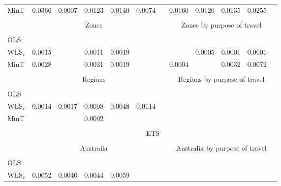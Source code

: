 \documentclass[11pt]{article}
\newcommand{\0}{\phantom{0}}
\begin{document}
\begin{table}[p]
\begin{threeparttable}
\begin{tabular}{lrrrrrrrrrrr}
			MinT & 0.0366 & 0.0007 & 0.0123 & 0.0140 & 0.0074 & & 0.0160 & 0.0120 & 0.0135 & 0.0255 & \bm{$-0.0164$} \\
			\cline{2-6} \cline{8-12}\\[-0.3cm]
			& \multicolumn{5}{c}{Zones} & & \multicolumn{5}{c}{Zones by purpose of travel} \\
			\cline{2-6} \cline{8-12} \\[-0.3cm]
			OLS & \bm{$-0.1115$} & \bm{$-0.1038$} & \bm{$-0.1090$} & \bm{$-0.1141$} & \bm{$-0.1489$} & & \bm{$-0.4320$} & \bm{$-0.6144$} & \bm{$-0.5723$} & \bm{$-0.7088$} & \bm{$-0.6646$} \\
			WLS$_{v}$ & 0.0015 & \bm{$-0.0009$} & 0.0011 & 0.0019 & \bm{$-0.0018$} & & \bm{$-0.0004$} & 0.0005 & 0.0001 & 0.0001 & \bm{$-0.0071$} \\
			MinT & 0.0028 & \bm{$-0.0037$} & 0.0031 & 0.0019 & \bm{$-0.0161$} & & 0.0004 & \bm{$-0.0044$} & 0.0032 & 0.0072 & \bm{$-0.0234$} \\
			\cline{2-6} \cline{8-12}\\[-0.3cm]
			& \multicolumn{5}{c}{Regions} & & \multicolumn{5}{c}{Regions by purpose of travel} \\
			\cline{2-6} \cline{8-12} \\[-0.3cm]
			OLS & \bm{$-0.1474$} & \bm{$-0.1246$} & \bm{$-0.1164$} & \bm{$-0.1263$} & \bm{$-0.1480$} & & \bm{$-0.5573$} & \bm{$-0.6581$} & \bm{$-0.5831$} & \bm{$-0.7258$} & \bm{$-0.7480$} \\
			WLS$_{v}$ & 0.0014 & 0.0017 & 0.0008 & 0.0048 & 0.0114 & & \bm{$-0.0052$} & \bm{$-0.0049$} & \bm{$-0.0044$} & \bm{$-0.0057$} & \bm{$-0.0150$} \\
			MinT & \bm{$-0.0002$} & \bm{$-0.0056$} & 0.0002 & \bm{$-0.0003$} & \bm{$-0.0012$} & & \bm{$-0.0134$} & \bm{$-0.0189$} & \bm{$-0.0104$} & \bm{$-0.0097$} & \bm{$-0.0265$} \\
			\cline{2-6} \cline{8-12} \\[-0.3cm]
			& \multicolumn{11}{c}{ETS} \\
			\cline{2-12} \\[-0.3cm]
			& \multicolumn{5}{c}{Australia} & & \multicolumn{5}{c}{Australia by purpose of travel} \\
			\cline{2-6} \cline{8-12}\\[-0.3cm]
			OLS & \bm{$-0.0236$} & \bm{$-0.0021$} & \bm{$-0.0028$} & \bm{$-0.0116$} & \bm{$-0.0468$} & & \bm{$-0.0066$} & \bm{$-0.0088$} & \bm{$-0.0060$} & \bm{$-0.0103$} & \bm{$-0.0222$} \\
			WLS$_{v}$ & 0.0052 & 0.0040 & 0.0044 & 0.0059 & \bm{$-0.0002$} & & \bm{$-0.0018$} & \bm{$-0.0026$} & \bm{$-0.0023$} & \bm{$-0.0043$} & \bm{$-0.0026$} \\

\end{tabular}
\end{threeparttable}
\end{table}
\end{document}
